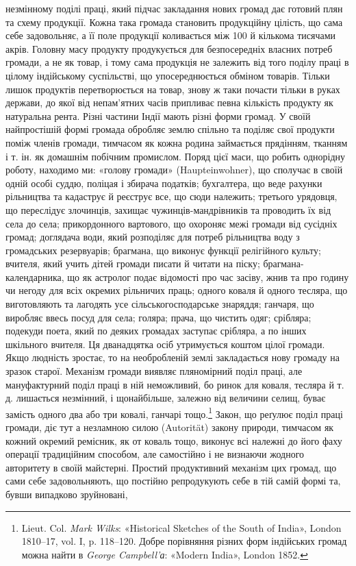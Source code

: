 \parcont{}  %
незмінному поділі праці, який підчас закладання нових громад
дає готовий плян та схему продукції. Кожна така громада становить
продукційну цілість, що сама себе задовольняє, а її поле
продукції коливається між 100 й кількома тисячами акрів. Головну
масу продукту продукується для безпосередніх власних
потреб громади, а не як товар, і тому сама продукція не залежить
від того поділу праці в цілому індійському суспільстві, що упосереднюється
обміном товарів. Тільки лишок продуктів перетворюється
на товар, знову ж таки почасти тільки в руках держави,
до якої від непам’ятних часів припливає певна кількість продукту
як натуральна рента. Різні частини Індії мають різні
форми громад. У своїй найпростішій формі громада обробляє
землю спільно та поділяє свої продукти поміж членів громади,
тимчасом як кожна родина займається прядінням, тканням і т. ін.
як домашнім побічним промислом. Поряд цієї маси, що робить
однорідну роботу, находимо ми: «голову громади» (Haupteinwohner),
що сполучає в своїй одній особі суддю, поліцая і збирача
податків; бухгалтера, що веде рахунки рільництва та кадаструє
й реєструє все, що сюди належить; третього урядовця, що переслідує
злочинців, захищає чужинців-мандрівників та проводить
їх від села до села; прикордонного вартового, що охороняє межі
громади від сусідніх громад; доглядача води, який розподіляє
для потреб рільництва воду з громадських резервуарів; брагмана,
що виконує функції релігійного культу; вчителя, який учить
дітей громади писати й читати на піску; брагмана-календарника,
що як астролог подає відомості про час засіву, жнив та про годину
чи негоду для всіх окремих рільничих праць; одного коваля й
одного тесляра, що виготовляють та лагодять усе сільськогосподарське
знаряддя; ганчаря, що виробляє ввесь посуд для
села; голяра; прача, що чистить одяг; срібляра; подекуди поета,
який по деяких громадах заступає срібляра, а по інших шкільного
вчителя. Ця дванадцятка осіб утримується коштом цілої
громади. Якщо людність зростає, то на необробленій землі закладається
нову громаду на зразок старої. Механізм громади виявляє
пляномірний поділ праці, але мануфактурний поділ праці в ній
неможливий, бо ринок для коваля, тесляра й т. д. лишається незмінний,
і щонайбільше, залежно від величини селищ, буває
замість одного два або три ковалі, ганчарі тощо.\footnote{
Lieut. Col. \emph{Mark Wilks}: «Historical Sketches of the South
of India», London 1810--17, vol. I, p. 118--120. Добре порівняння
різних форм індійських громад можна найти в \emph{George Campbell’а}:
«Modern India», London 1852.
} Закон, що
реґулює поділ праці громади, діє тут а незламною силою (Autorität)
закону природи, тимчасом як кожний окремий ремісник,
як от коваль тощо, виконує всі належні до його фаху операції
традиційним способом, але самостійно і не визнаючи жодного
авторитету в своїй майстерні. Простий продуктивний механізм
цих громад, що сами себе задовольняють, що постійно репродукують
себе в тій самій формі та, бувши випадково зруйновані,
\parbreak{}  %
